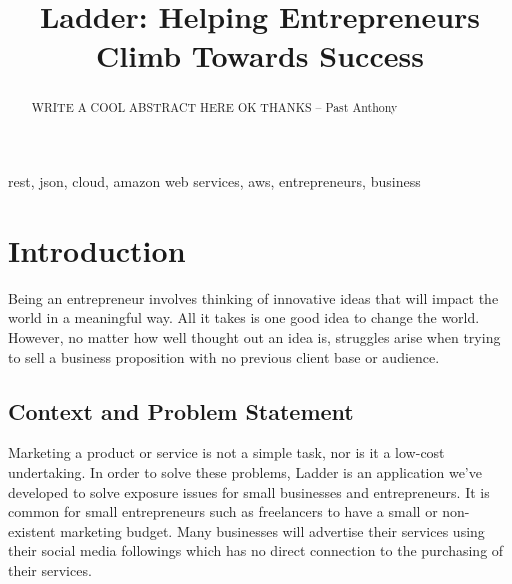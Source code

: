 \documentclass[conference]{IEEEtran}
\begin{document}
\title{Ladder: Helping Entrepreneurs Climb Towards Success}

\author{
\and
{}
}

\maketitle

\begin{abstract}
WRITE A COOL ABSTRACT HERE OK THANKS -- Past Anthony
\end{abstract}

\begin{IEEEkeywords}
rest, json, cloud, amazon web services, aws, entrepreneurs, business
\end{IEEEkeywords}

\section{Introduction}

Being an entrepreneur involves thinking of innovative ideas that will impact the world in a meaningful way. All it takes is one good idea to change the world. However, no matter how well thought out an idea is, struggles arise when trying to sell a business proposition with no previous client base or audience. 

\subsection{Context and Problem Statement}

Marketing a product or service is not a simple task, nor is it a low-cost undertaking. In order to solve these problems, Ladder is an application we've developed to solve exposure issues for small businesses and entrepreneurs. It is common for small entrepreneurs such as freelancers to have a small or non-existent marketing budget. Many businesses will advertise their services using their social media followings which has no direct connection to the purchasing of their services.
\end{document}
